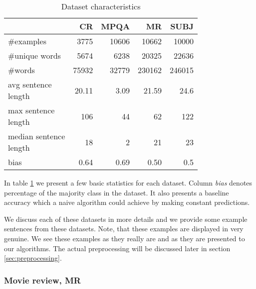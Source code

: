 \begin{table}[h]
\begin{center}

\begin{tabular}{l|rrrr} 
\toprule
  &        CR &      MPQA &         MR &      SUBJ \\
\midrule
\#examples                             &   3775 &  10606 &   10662 &   10000 \\\hline 
\#unique words                         &   5674 &   6238 &   20325 &   22636 \\\hline 
\#words                                &  75932 &  32779 &  230162 &  246015 \\\hline 
\specialcell{avg sentence\\length}    &     20.11 &      3.09 &      21.59 &      24.6 \\\hline
\specialcell{max sentence\\length}    &    106 &     44 &      62 &     122 \\\hline 
\specialcell{median sentence\\length} &     18 &      2 &      21 &      23 \\\hline 
bias                                  &      0.64 &      0.69 &       0.50 &       0.5 \\
\bottomrule
\end{tabular}

\caption[Dataset characteristics]{Dataset characteristics}
\label{tab:datasets:stats}
\end{center}
\end{table}


    In table \ref{tab:datasets:stats} we present a few basic statistics for each dataset.
    Column \emph{bias} denotes percentage of the majority class in the dataset.
    It also presents a baseline accuracy which a naive algorithm could achieve by making constant predictions. 
    
    We discuss each of these datasets in more details and we provide some example sentences from these datasets.
    Note, that these examples  are displayed in very genuine. We see these examples as they really are and as they are presented to our algorithms.
    The actual preprocessing will be discussed later in section \ref{sec:preprocessing}.
    
    \subsubsection{Movie review, MR}
    
